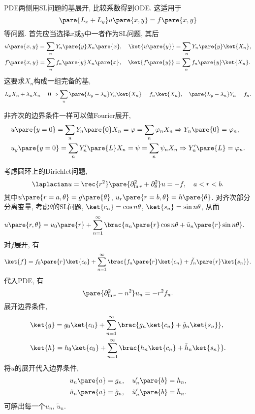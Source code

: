 \documentclass[hidelinks]{ctexart}
\begin{document}
PDE两侧用SL问题的基展开, 比较系数得到ODE. 这适用于
\[ \pare{L_x+L_y}u\pare{x,y} = f\pare{x,y} \]
等问题. 首先应当选择$x$或$y$中一者作为SL问题, 其后
\begin{align*}
    & u\pare{x,y} = \sum_n Y_n\pare{y}X_n\pare{x},\quad \ket{u\pare{y}} = \sum_n Y_n\pare{y}\ket{X_n}, \\
    & f\pare{x,y} = \sum_n f_n\pare{y}X_n\pare{x},\quad \ket{f\pare{y}} = \sum_n f_n\pare{y}\ket{X_n}.
\end{align*}
这要求$X_n$构成一组完备的基,
\[ L_x X_n + \lambda_n X_n = 0 \Rightarrow \sum_n\pare{L_y - \lambda_n} Y_n \ket{X_n} = f_n\ket{X_n},\quad \pare{L_y - \lambda_n} Y_n = f_n. \]
\par
非齐次的边界条件一样可以做Fourier展开,
\begin{align*}
    & u\pare{y=0} = \sum_n Y_n\pare{0}X_n = \varphi = \sum_n \varphi_n X_n \Rightarrow Y_n\pare{0} = \varphi_n, \\
    & u_y\pare{y=0} = \sum_n Y_n'\pare{L}X_n = \psi = \sum_n \psi_n X_n \Rightarrow Y_n'\pare{L} = \varphi_n.
\end{align*}
\begin{sample}
    \begin{ex}
        考虑圆环上的Dirichlet问题,
        \[ \laplacian u = \rec{r^2}\pare{\partial_{\ln r}^2 + \partial_\theta^2} u = -f,\quad a<r<b. \]
        其中$u\pare{r=a,\theta} = g\pare{\theta}$, $u_r\pare{r=b,\theta} = h\pare{\theta}$. 对齐次部分分离变量, 考虑$\theta$的SL问题, $\ket{c_n} = \cos n\theta$, $\ket{s_n} = \sin n\theta$, 从而
        \begin{align*}
            & u\pare{r,\theta} = u_0\pare{r} + \sum_{n=1}^\infty \brac{u_n\pare{r} \cos n\theta + \tilde{u}_n\pare{r}\sin n\theta}.
        \end{align*}
        对$f$展开, 有
        \[ \ket{f} = f_0\pare{r}\ket{c_0} + \sum_{n=1}^\infty \brac{f_n\pare{r}\ket{c_n} + \tilde{f_n}\pare{r}\ket{s_n}}. \]
        代入PDE, 有
        \[ \pare{\partial^2_{\ln r} - n^2}u_n = -r^2f_n. \]
        展开边界条件,
        \begin{align*}
            & \ket{g} = g_0\ket{c_0} + \sum_{n=1}^\infty \brac{g_n\ket{c_n} + \tilde{g}_n\ket{s_n}},\\
            & \ket{h} = h_0\ket{c_0} + \sum_{n=1}^\infty \brac{h_n\ket{c_n} + \tilde{h}_n\ket{s_n}}.
        \end{align*}
        将$u$的展开代入边界条件,
        \begin{align*}
            & u_n\pare{a} = g_n,\quad u_n'\pare{b} = h_n, \\
            & \tilde{u}_n\pare{a} = \tilde{g}_n,\quad \tilde{u}_n'\pare{b} = \tilde{h}_n.
        \end{align*}
        可解出每一个$u_n$, $\tilde{u}_n$.
    \end{ex}
\end{sample}



\end{document}
